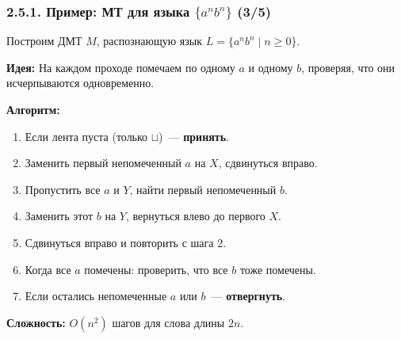 \documentclass[mathserif,12pt,aspectratio=169]{beamer}
\def\NB#1{{\bf\color{brown}#1}}
\let\ge\geqslant
\begin{document}
\begin{frame}
\frametitle{2.5.1. Пример: МТ для языка $\{a^n b^n\}$ (3/5)}

\begin{example}
Построим ДМТ $M$, распознающую язык $L = \{a^n b^n \mid n \ge 0\}$.

\NB{Идея:} На каждом проходе помечаем по одному $a$ и одному $b$, 
проверяя, что они исчерпываются одновременно.

\NB{Алгоритм:}
\begin{enumerate}
\item Если лента пуста (только $\sqcup$)~--- \textbf{принять}.
\item Заменить первый непомеченный $a$ на $X$, сдвинуться вправо.
\item Пропустить все $a$ и $Y$, найти первый непомеченный $b$.
\item Заменить этот $b$ на $Y$, вернуться влево до первого $X$.
\item Сдвинуться вправо и повторить с шага 2.
\item Когда все $a$ помечены: проверить, что все $b$ тоже помечены.
\item Если остались непомеченные $a$ или $b$~--- \textbf{отвергнуть}.
\end{enumerate}

\NB{Сложность:} $O(n^2)$ шагов для слова длины $2n$.
\end{example}

\end{frame}
\end{document}
